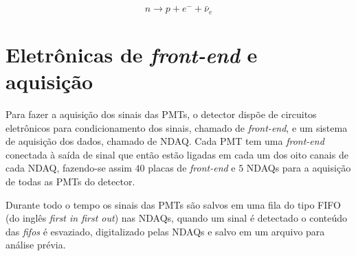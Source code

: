 \begin{equation}
n \rightarrow p + e^- + \bar{\nu}_e 
\end{equation}

\section{Eletrônicas de \emph{front-end} e aquisição}

Para fazer a aquisição dos sinais das PMTs, o detector dispõe de circuitos eletrônicos para condicionamento dos sinais, chamado de \emph{front-end}, e um sistema de aquisição dos dados, chamado de \ac{NDAQ}. Cada PMT tem uma \emph{front-end} conectada à saída de sinal que então estão ligadas em cada um dos oito canais de cada NDAQ, fazendo-se assim $40$ placas de \emph{front-end} e $5$ NDAQs para a aquisição de todas as PMTs do detector.

Durante todo o tempo os sinais das PMTs são salvos em uma fila do tipo FIFO (do inglês \emph{first in first out}) nas NDAQs, quando um sinal é detectado o conteúdo das \emph{fifos} é esvaziado, digitalizado pelas NDAQs e salvo em um arquivo para análise prévia.

